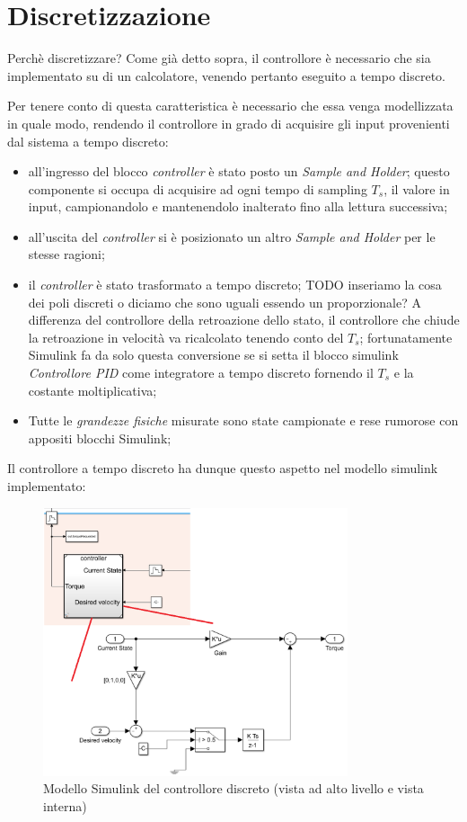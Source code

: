 \section{Discretizzazione}
Perchè discretizzare?
Come già detto sopra, il controllore è necessario che sia implementato su di un calcolatore, venendo pertanto eseguito a tempo discreto.



Per tenere conto di questa caratteristica è necessario che essa venga modellizzata in quale modo, rendendo il controllore in grado di acquisire gli input provenienti dal sistema a tempo discreto:
\begin{itemize}
	\item all'ingresso del blocco \textit{controller} è stato posto un \textit{Sample and Holder}; questo componente si occupa di acquisire ad ogni tempo di sampling $T_s$, il valore in input, campionandolo e mantenendolo inalterato fino alla lettura successiva;
	\item all'uscita del \textit{controller} si è posizionato un altro \textit{Sample and Holder} per le stesse ragioni;
	\item il \textit{controller} è stato trasformato a tempo discreto; TODO inseriamo la cosa dei poli discreti o diciamo che sono uguali essendo un proporzionale?
	A differenza del controllore della retroazione dello stato, il controllore che chiude la retroazione in velocità va ricalcolato tenendo conto del $T_s$; fortunatamente Simulink fa da solo questa conversione se si setta il blocco simulink \textit{Controllore PID} come integratore a tempo discreto fornendo il $T_s$ e la costante moltiplicativa;
	\item Tutte le \textit{grandezze fisiche} misurate sono state campionate e rese rumorose con appositi blocchi Simulink;
\end{itemize}
Il controllore a tempo discreto ha dunque questo aspetto nel modello simulink implementato:
\begin{figure}[H]
	\centering   	
	\includegraphics[width=0.8\textwidth]{Immagini/controller_discrete.png}
	\caption{Modello Simulink del controllore discreto (vista ad alto livello e vista interna)}
	\label{fig:controller_discrete}
\end{figure}

